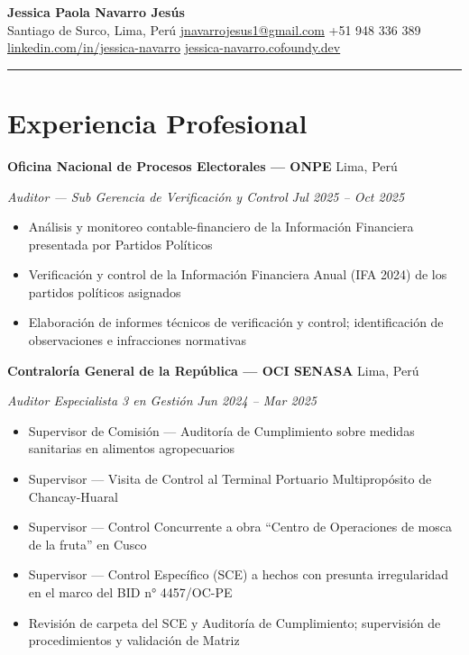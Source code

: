 \documentclass[10pt,letterpaper]{article}
\newcommand{\entry}[4]{%
  \noindent\textbf{#1} \hfill #2 \par\nopagebreak
  \textit{#3} \hfill \textit{#4} \par\nopagebreak
}
\begin{document}
\begin{center}
  {\LARGE\bfseries Jessica Paola Navarro Jesús} \\[3pt]
  \enspace Santiago de Surco, Lima, Perú
  \quad{}\enspace \href{mailto:jnavarrojesus1@gmail.com}{jnavarrojesus1@gmail.com}
  \quad{}\enspace +51 948 336 389
  \\[2pt]
  \enspace \href{https://www.linkedin.com/in/jessica-paola-navarro-jesus-76ba3636/}{linkedin.com/in/jessica-navarro}
  \quad{}\enspace \href{https://jessica-navarro.cofoundy.dev}{jessica-navarro.cofoundy.dev}
\end{center}

\vspace{-0.4em}
\noindent\rule{\textwidth}{0.8pt}
\vspace{-0.8em}

\section{Experiencia Profesional}

\entry{Oficina Nacional de Procesos Electorales — ONPE}{Lima, Perú}{Auditor — Sub Gerencia de Verificación y Control}{Jul 2025 -- Oct 2025}
\begin{itemize}
  \item Análisis y monitoreo contable-financiero de la Información Financiera presentada por Partidos Políticos
  \item Verificación y control de la Información Financiera Anual (IFA 2024) de los partidos políticos asignados
  \item Elaboración de informes técnicos de verificación y control; identificación de observaciones e infracciones normativas
\end{itemize}
\vspace{0.2em}

\entry{Contraloría General de la República — OCI SENASA}{Lima, Perú}{Auditor Especialista 3 en Gestión}{Jun 2024 -- Mar 2025}
\begin{itemize}
  \item Supervisor de Comisión — Auditoría de Cumplimiento sobre medidas sanitarias en alimentos agropecuarios
  \item Supervisor — Visita de Control al Terminal Portuario Multipropósito de Chancay-Huaral
  \item Supervisor — Control Concurrente a obra ``Centro de Operaciones de mosca de la fruta'' en Cusco
  \item Supervisor — Control Específico (SCE) a hechos con presunta irregularidad en el marco del BID n° 4457/OC-PE
  \item Revisión de carpeta del SCE y Auditoría de Cumplimiento; supervisión de procedimientos y validación de Matriz
\end{itemize}
\vspace{0.2em}
\end{document}
